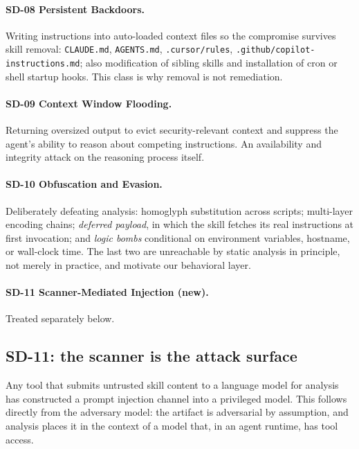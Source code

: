 \documentclass[11pt]{article}
\begin{document}
\paragraph{SD-08 \textbullet{} Persistent Backdoors.} Writing instructions into
auto-loaded context files so the compromise survives skill removal:
\texttt{CLAUDE.md}, \texttt{AGENTS.md}, \texttt{.cursor/rules},
\texttt{.github/copilot-instructions.md}; also modification of sibling skills
and installation of cron or shell startup hooks. This class is why removal is
not remediation.

\paragraph{SD-09 \textbullet{} Context Window Flooding.} Returning oversized
output to evict security-relevant context and suppress the agent's ability to
reason about competing instructions. An availability and integrity attack on
the reasoning process itself.

\paragraph{SD-10 \textbullet{} Obfuscation and Evasion.} Deliberately defeating
analysis: homoglyph substitution across scripts; multi-layer encoding chains;
\emph{deferred payload}, in which the skill fetches its real instructions at
first invocation; and \emph{logic bombs} conditional on environment variables,
hostname, or wall-clock time. The last two are unreachable by static analysis
in principle, not merely in practice, and motivate our behavioral layer.

\paragraph{SD-11 \textbullet{} Scanner-Mediated Injection (new).} Treated
separately below.

\subsection{SD-11: the scanner is the attack surface}

Any tool that submits untrusted skill content to a language model for analysis
has constructed a prompt injection channel into a privileged model. This
follows directly from the adversary model: the artifact is adversarial by
assumption, and analysis places it in the context of a model that, in an agent
runtime, has tool access.
\end{document}
